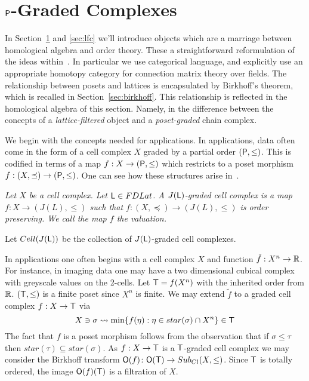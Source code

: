 

\section{${\mathsf P}$-Graded Complexes}\label{sec:grad}

In Section~\ref{sec:grad} and \ref{sec:lfc} we'll introduce objects which are a marriage between homological algebra and order theory.  These a straightforward reformulation of the ideas within~\cite[Section 7]{robbin:salamon2}.  In particular we use categorical language, and explicitly use an appropriate homotopy category for connection matrix theory over fields.    The relationship between posets and lattices is encapsulated by Birkhoff's theorem, which is recalled in Section~\ref{sec:birkhoff}.  This relationship is reflected in the homological algebra of this section.  Namely, in the difference between the concepts of a {\em lattice-filtered} object and a {\em poset-graded} chain complex.  

We begin with the concepts needed for applications.  In applications, data often come in the form of a cell complex $X$ graded by a partial order $({\mathsf P},\leq)$.  This is codified in terms of a map $f:X\to ({\mathsf P},\leq)$ which restricts to a poset morphism $f:(X,\preceq)\to ({\mathsf P},\leq)$.   One can see how these structures arise in~\cite{braids}.  

\begin{defn}
{\em
Let $X$ be a cell complex.  Let ${\mathsf L}\in FDLat$.  A {\em $J({\mathsf L})$-graded cell complex} is a map $f:X\to (J(L),\leq)$ such that $f:(X,\preceq)\to (J(L),\leq)$ is order preserving.  We call the map $f$ the {\em valuation}.
}
\end{defn}


Let $Cell(J({\mathsf L}))$ be the collection of $J({\mathsf L})$-graded cell complexes.  

\begin{ex}
In applications one often begins with a cell complex $X$ and function $\tilde f:X^n\to {\mathbb{R}}$.  For instance, in imaging data one may have a two dimensional cubical complex with greyscale values on the 2-cells. Let ${\mathsf T}=f(X^n)$ with the inherited order from ${\mathbb{R}}$.  $({\mathsf T},\leq)$ is a finite poset since $X^n$ is finite.  We may extend $\tilde f$ to a graded cell complex $f:X\to {\mathsf T}$ via
\[
X\ni \sigma \rightsquigarrow \min\{f(\eta): \eta\in star(\sigma)\cap X^n\} \in {\mathsf T}
\]
The fact that $f$ is a poset morphism follows from the observation that if $\sigma \leq \tau$ then $star(\tau)\subseteq star(\sigma)$.   As $f:X\to {\mathsf T}$ is a ${\mathsf T}$-graded cell complex we may consider the Birkhoff transform ${\mathsf O}(f)\colon {\mathsf O}({\mathsf T})\to Sub_{Cl}(X,\leq)$.  Since ${\mathsf T}$ is totally ordered, the image ${\mathsf O}(f)({\mathsf T})$ is a filtration of $X$.
\end{ex}

